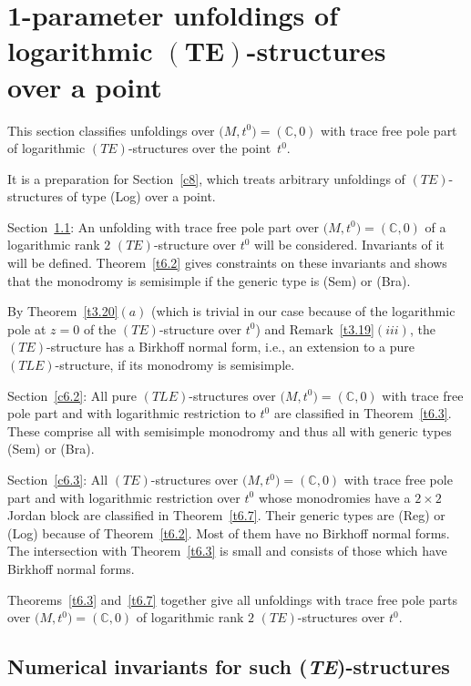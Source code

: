 \documentclass[10pt,a4paper]{amsart}
\numberwithin{equation}{section}
\numberwithin{figure}{section}
\newcommand{\C}{{\mathbb C}}
\begin{document}
\section[1-parameter unfoldings of logarithmic $(TE)$-structuresover a point]
{1-parameter unfoldings of logarithmic $\boldsymbol{(TE)}$-structures \\over a point}\label{c6}

This section classifies unfoldings over $\big(M,t^0\big)=(\C,0)$
with trace free pole part
of logarithmic $(TE)$-structures over the point~$t^0$.

It is a preparation for Section~\ref{c8},
which treats arbitrary unfoldings of $(TE)$-structures
of type (Log) over a point.

Section~\ref{c6.1}: An unfolding with trace free pole part
over $\big(M,t^0\big)=(\C,0)$ of a logarithmic rank $2$ $(TE)$-structure
over $t^0$ will be considered. Invariants of it will
be defined. Theorem~\ref{t6.2} gives constraints on these
invariants and shows that the monodromy is
semisimple if the generic type is (Sem) or (Bra).

By Theorem~\ref{t3.20}$(a)$ (which is trivial in our case
because of the logarithmic pole at $z=0$ of the $(TE)$-structure
over $t^0$) and Remark~\ref{t3.19}$(iii)$,
the $(TE)$-structure has a Birkhoff normal form,
i.e., an extension to a pure $(TLE)$-structure,
if its monodromy is semisimple.

Section~\ref{c6.2}: All pure $(TLE)$-structures over
$\big(M,t^0\big)=(\C,0)$ with trace free pole part and with
logarithmic restriction to $t^0$ are classified
in Theorem~\ref{t6.3}. These comprise all with
semisimple monodromy and thus all with generic
types (Sem) or (Bra).

Section~\ref{c6.3}: All $(TE)$-structures
over $\big(M,t^0\big)=(\C,0)$ with trace free pole part and
with logarithmic restriction over $t^0$ whose
monodromies have a $2\times 2$ Jordan block
are classified in Theorem~\ref{t6.7}.
Their generic types are (Reg) or (Log) because of
Theorem~\ref{t6.2}.
Most of them have no Birkhoff normal forms.
The intersection with Theorem~\ref{t6.3} is small
and consists of those which have Birkhoff normal forms.

Theorems~\ref{t6.3} and~\ref{t6.7} together give
all unfoldings with trace free pole parts
over $\big(M,t^0\big)=(\C,0)$ of logarithmic rank $2$
$(TE)$-structures over $t^0$.





\subsection{Numerical invariants for such (\emph{TE})-structures}
\label{c6.1}
\end{document}
